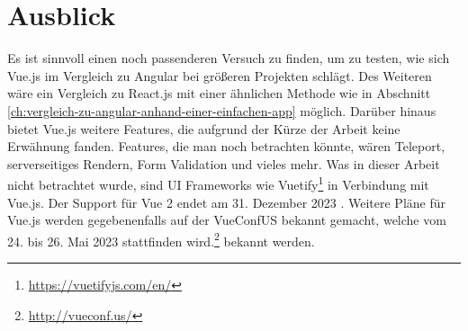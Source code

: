 
\chapter{Ausblick}
Es ist sinnvoll einen noch passenderen Versuch zu finden, um zu testen,
wie sich Vue.js im Vergleich zu Angular bei größeren Projekten schlägt.
Des Weiteren wäre ein Vergleich zu React.js mit einer ähnlichen Methode wie in Abschnitt \ref{ch:vergleich-zu-angular-anhand-einer-einfachen-app} möglich.
Darüber hinaus bietet Vue.js weitere Features, die aufgrund der Kürze der Arbeit keine Erwähnung fanden.
Features, die man noch betrachten könnte, wären Teleport, serverseitiges Rendern, Form Validation und vieles mehr.
Was in dieser Arbeit nicht betrachtet wurde, sind UI Frameworks wie Vuetify\footnote{\url{https://vuetifyjs.com/en/}} in Verbindung mit Vue.js.
Der Support für Vue 2 endet am 31. Dezember 2023 \cite{vueFAQ}.
Weitere Pläne für Vue.js werden gegebenenfalls auf der VueConfUS bekannt gemacht, welche vom 24. bis 26. Mai 2023 stattfinden wird.\footnote{\url{http://vueconf.us/}} bekannt werden.